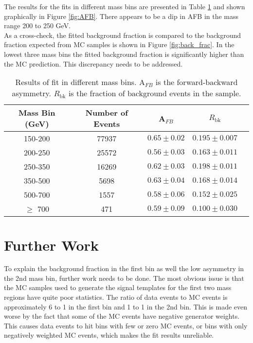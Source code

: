 \documentclass[
    10pt, %
    a4paper, %
    oneside, %
    headinclude,footinclude, %
    BCOR5mm, %
]{scrartcl}
\begin{document}
    The results for the fits in different mass bins are presented in Table \ref{tab:results} and shown
    graphically in Figure \ref{fig:AFB}. There appears to be a dip in AFB in the mass range 200 to 250 GeV.\\

    As a cross-check, the fitted background fraction is compared to the background fraction expected from 
    MC samples is shown in Figure \ref{fig:back_frac}.
    In the lowest three mass bins the fitted background fraction is significantly higher than the MC
    prediction. This discrepancy needs to be addressed. \\

    \begin{table}[h]
        \centering

        \caption{ Results of fit in different mass bins. A$_{FB}$ is the forward-backward asymmetry.
        $R_\mathrm{bk}$ is the fraction of background events in the sample. }
        \label{tab:results}
        \begin{tabular}{|| c | c | c | c | c ||}
            \hline
            Mass Bin (GeV)  & Number of Events &  
            A$_{FB}$ & $R_\mathrm{bk}$\\
            \hline \hline
            150-200 & 77937 & $0.65 \pm 0.02$ & $0.195 \pm 0.007$    \\
            200-250 & 25572 & $0.56 \pm 0.03$ & $0.163 \pm 0.011$   \\
            250-350 & 16269 & $0.62 \pm 0.03$ & $0.198 \pm 0.011$   \\
            350-500 & 5698 & $0.63 \pm 0.04$ & $0.168 \pm 0.014$    \\
            500-700 & 1557 & $0.58 \pm 0.06$ & $0.152 \pm 0.025$    \\
            $\geq$ 700 & 471 & $0.59 \pm 0.09$ & $0.100 \pm 0.030$   \\



            \hline

        \end{tabular}

    \end{table}

    \section{Further Work}
    To explain the background fraction in the first bin as well the low asymmetry in the 2nd mass bin, further work needs to be done.
    The most obvious issue is that the MC samples used to generate the signal templates for the first two mass regions have quite poor statistics. 
    The ratio of data events to MC events is approximately 6 to 1 in the first bin and 1 to 1 in the 2nd bin. This is made even worse by the fact that some
    of the MC events have negative generator weights. This causes data events to hit bins with few or zero MC events, or bins with only negatively weighted
    MC events, which makes the fit results unreliable. \\
\end{document}
